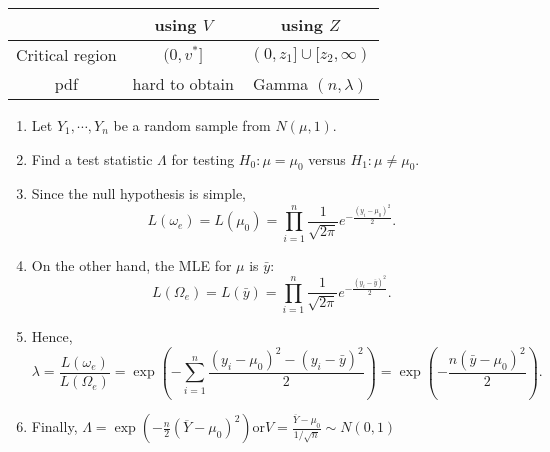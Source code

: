 \begin{frame}[fragile]
\begin{center}

	\renewcommand{\arraystretch}{2}
	\begin{tabular}{c|cc}
                  & using $V$      & using $Z$                  \\ \hline
	Critical region & $(0,v^*]$      & $(0,z_1]\cup [z_2,\infty)$ \\
	pdf             & hard to obtain & Gamma $(n,\lambda)$        \\
	\end{tabular}
\end{center}
\end{frame}
\begin{frame}

	\begin{enumerate}
		\item[E.g. 4] Let $Y_1,\cdots,Y_n$ be a random sample from $N(\mu,1)$.
		\item[] Find a test statistic $\Lambda$ for testing $H_0 : \mu = \mu_0$ versus $H_1 : \mu \ne \mu_0$.
			\vfill
		\item[Sol.]Since the null hypothesis is simple,
\[
	L(\omega_e) = L(\mu_0) = \prod_{i=1}^n\frac{1}{\sqrt{2\pi}}e^{-\frac{(y_i-\mu_0)^2}{2}}.
\]
\item[] On the other hand, the MLE for $\mu$ is $\bar{y}$:
	\[
	L(\Omega_e) = L(\bar{y}) =
	\prod_{i=1}^n\frac{1}{\sqrt{2\pi}}e^{-\frac{(y_i-\bar{y})^2}{2}}.
	\]
\item[] Hence,
\[	 \lambda=\frac{L(\omega_e)}{L(\Omega_e)}
	 = \exp\left(-\sum_{i=1}^n \frac{(y_i-\mu_0)^2 -(y_i-\bar{y})^2}{2}\right)
	 = \exp\left(-\frac{n (\bar{y}-\mu_0)^2}{2}\right).
\]
 \item[] Finally, $\Lambda= \exp\left(-\frac{n}{2} \left(\overline{Y}-\mu_0\right)^2
	 \right)$\pause\qquad or\qquad $V =  \frac{\overline{Y}-\mu_0}{1/\sqrt{n}}\sim N(0,1)$ \myEnd
	\end{enumerate}
\end{frame}
